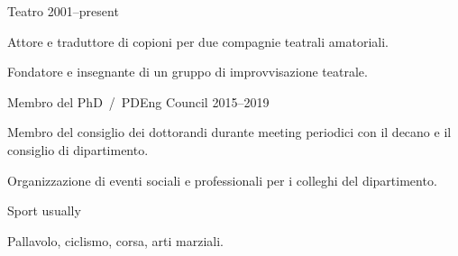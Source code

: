 
\begin{cventries}
    \cventry%
        {Teatro} %
        {} %
        {}%
        {2001--present} %
        {\begin{cvitems}
            \item {Attore e traduttore di copioni per due compagnie teatrali amatoriali.}
            \item {Fondatore e insegnante di un gruppo di improvvisazione teatrale.}
        \end{cvitems}}

    \cventry%
        {Membro del PhD~/~PDEng Council} %
        {} %
        {} %
        {2015--2019} %
        {\begin{cvitems}
            \item {Membro del consiglio dei dottorandi durante meeting periodici con il decano e il consiglio di dipartimento.}
            \item {Organizzazione di eventi sociali e professionali per i colleghi del dipartimento.}
        \end{cvitems}}

    \cventry%
        {Sport} %
        {} %
        {} %
        {usually} %
        {\begin{cvitems}
            \item {Pallavolo, ciclismo, corsa, arti marziali.}
        \end{cvitems}}
\end{cventries}
